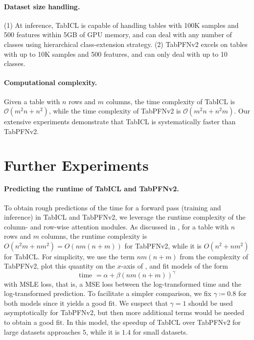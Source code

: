 \documentclass{article}
\theoremstyle{plain}
\theoremstyle{definition}
\theoremstyle{remark}
\begin{document}
\paragraph{Dataset size handling.} (1) At inference, TabICL is capable of handling tables with 100K samples and 500 features within 5GB of GPU memory, and can deal with any number of classes using hierarchical class-extension strategy. (2) TabPFNv2 excels on tables with up to 10K samples and 500 features, and can only deal with up to 10 classes.

\paragraph{Computational complexity.} Given a table with $n$ rows and $m$ columns, the time complexity of TabICL is $\mathcal{O}(m^2 n + n^2)$, while the time complexity of TabPFNv2 is $\mathcal{O}(m^2 n + n^2 m)$. Our extensive experiments demonstrate that TabICL is systematically faster than TabPFNv2.

\section{Further Experiments} \label{sec:appendix:experiments}

\paragraph{Predicting the runtime of TabICL and TabPFNv2.} To obtain rough predictions of the time for a forward pass (training and inference) in TabICL and TabPFNv2, we leverage the runtime complexity of the column- and row-wise attention modules. 
As discussed in , for a table with $n$ rows and $m$ columns, the runtime complexity is $O(n^2 m + nm^2) = O(nm(n+m))$ for TabPFNv2, while it is $O(n^2 + nm^2)$ for TabICL. 
For simplicity, we use the term $nm(n+m)$ from the complexity of TabPFNv2, plot this quantity on the $x$-axis of , and fit models of the form
\begin{equation*}
    \text{time } = \alpha + \beta (nm(n+m))^\gamma
\end{equation*}
with MSLE loss, that is, a MSE loss between the log-transformed time and the log-transformed prediction. To facilitate a simpler comparison, we fix $\gamma \coloneqq 0.8$ for both models since it yields a good fit. We suspect that $\gamma = 1$ should be used asymptotically for TabPFNv2, but then more additional terms would be needed to obtain a good fit. In this model, the speedup of TabICL over TabPFNv2 for large datasets approaches $5$, while it is $1.4$ for small datasets.
\end{document}
